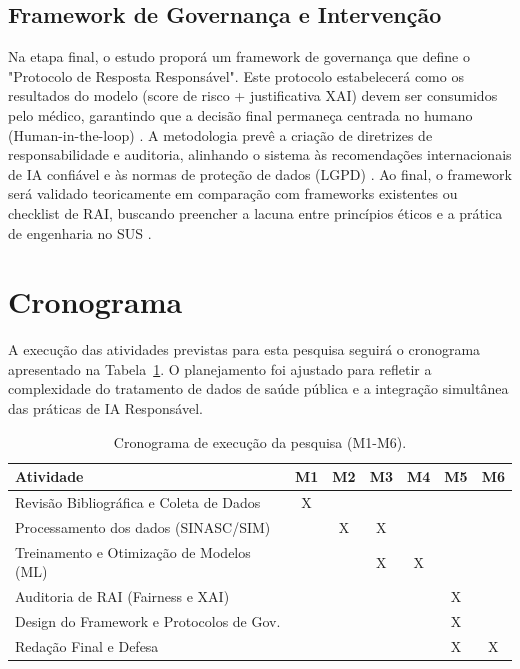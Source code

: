 \documentclass[12pt]{article}
\begin{document}
\subsection{Framework de Governança e Intervenção}
Na etapa final, o estudo proporá um framework de governança que define o "Protocolo de Resposta Responsável". Este protocolo estabelecerá como os resultados do modelo (score de risco + justificativa XAI) devem ser consumidos pelo médico, garantindo que a decisão final permaneça centrada no humano (Human-in-the-loop) \cite{Dignum2022, Lu2022}. A metodologia prevê a criação de diretrizes de responsabilidade e auditoria, alinhando o sistema às recomendações internacionais de IA confiável e às normas de proteção de dados (LGPD) \cite{ResponsibleAI2024}. Ao final, o framework será validado teoricamente em comparação com frameworks existentes ou checklist de RAI, buscando preencher a lacuna entre princípios éticos e a prática de engenharia no SUS \cite{Atheniense2024, EBIA2021}.

\section{Cronograma}
A execução das atividades previstas para esta pesquisa seguirá o cronograma apresentado na Tabela~\ref{tab:cronograma}. O planejamento foi ajustado para refletir a complexidade do tratamento de dados de saúde pública e a integração simultânea das práticas de IA Responsável.

\begin{table}[ht]
\centering
\caption{Cronograma de execução da pesquisa (M1-M6).}
\label{tab:cronograma}
\begin{tabular}{|l|c|c|c|c|c|c|}
\hline
\textbf{Atividade} & \textbf{M1} & \textbf{M2} & \textbf{M3} & \textbf{M4} & \textbf{M5} & \textbf{M6} \\ \hline
Revisão Bibliográfica e Coleta de Dados & X &  &  &  &  &  \\ \hline
Processamento dos dados (SINASC/SIM) &  & X & X &  &  &  \\ \hline
Treinamento e Otimização de Modelos (ML) &  &  & X & X &  &  \\ \hline
Auditoria de RAI (Fairness e XAI) &  &  &  &  & X &  \\ \hline
Design do Framework e Protocolos de Gov. &  &  &  &  & X &  \\ \hline
Redação Final e Defesa &  &  &  &  & X & X \\ \hline
\end{tabular}
\end{table}
\end{document}
